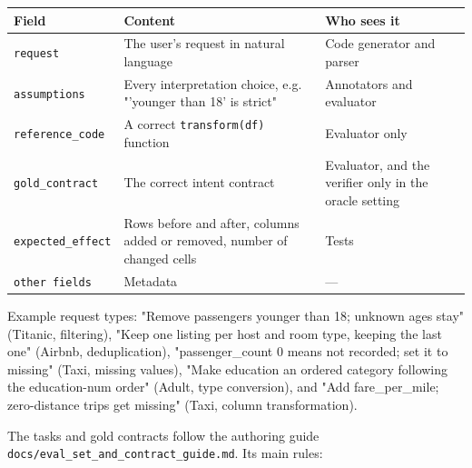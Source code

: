 \documentclass[11pt]{article}
\begin{document}
\begin{table}[!tp]
\centering\footnotesize\setlength{\tabcolsep}{3pt}\renewcommand{\arraystretch}{1.1}
\begin{tabularx}{\textwidth}{l>{\raggedright\arraybackslash}X>{\raggedright\arraybackslash}X}
\toprule
\textbf{Field} & \textbf{Content} & \textbf{Who sees it} \\
\midrule
\texttt{request} & The user's request in natural language & Code generator and parser \\
\texttt{assumptions} & Every interpretation choice, e.g. "'younger than 18' is strict" & Annotators and evaluator \\
\texttt{reference\_\allowbreak{}code} & A correct \texttt{transform(df)} function & Evaluator only \\
\texttt{gold\_\allowbreak{}contract} & The correct intent contract & Evaluator, and the verifier only in the oracle setting \\
\texttt{expected\_\allowbreak{}effect} & Rows before and after, columns added or removed, number of changed cells & Tests \\
\texttt{other fields} & Metadata & — \\
\bottomrule
\end{tabularx}
\end{table}

Example request types: "Remove passengers younger than 18; unknown ages
stay" (Titanic, filtering), "Keep one listing per host and room type,
keeping the last one" (Airbnb, deduplication), "passenger\_count 0 means
not recorded; set it to missing" (Taxi, missing values), "Make education
an ordered category following the education-num order" (Adult, type
conversion), and "Add fare\_per\_mile; zero-distance trips get missing"
(Taxi, column transformation).

The tasks and gold contracts follow the authoring guide
\texttt{docs/\allowbreak{}eval\_\allowbreak{}set\_\allowbreak{}and\_\allowbreak{}contract\_\allowbreak{}guide.\allowbreak{}md}.
Its main rules:
\end{document}
